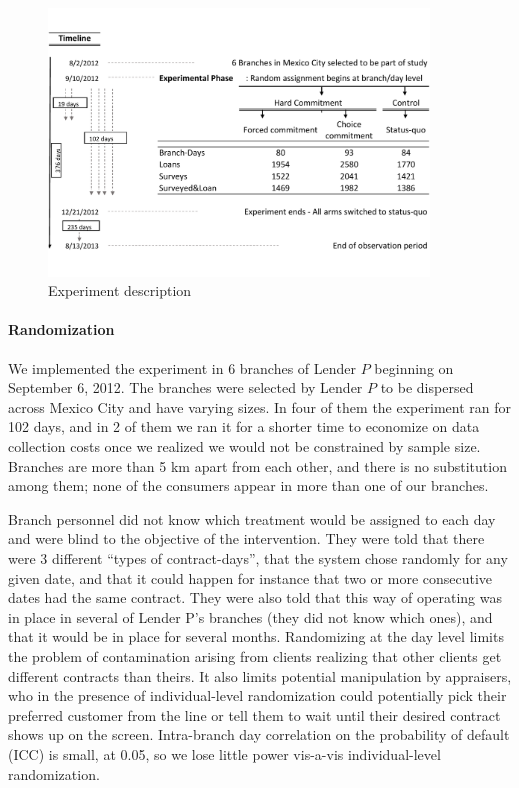 \documentclass[12pt, a4paper]{article}
\begin{document}
\begin{figure}[htbp]    
 \caption{Experiment description}
\begin{center}
\includegraphics[width=0.9\textwidth]{Figuras/consort.pdf}
  \end{center}
     \label{exp_description}
\end{figure}


\paragraph*{Randomization} We implemented the experiment in 6 branches of Lender $P$ beginning on September 6, 2012. The branches were selected by Lender $P$ to be dispersed across Mexico City and have varying sizes. In four of them the experiment ran for 102 days, and in 2 of them we ran it for a shorter time to economize on data collection costs once we realized we would not be constrained by sample size. %
Branches are more than 5 km apart from each other, and there is no substitution among them; none of the consumers appear in more than one of our branches.

Branch personnel did not know which treatment would be assigned to each day and were blind to the objective of the intervention. They were told that there were 3 different ``types of contract-days'', that the system chose randomly for any given date, and that it could happen for instance that two or more consecutive dates had the same contract. They were also told that this way of operating was in place in several of Lender P's branches (they did not know which ones), and that it would be in place for several months. Randomizing at the day level limits the problem of contamination arising from clients realizing that other clients get different contracts than theirs. It also limits potential manipulation by appraisers, who in the presence of individual-level randomization could potentially pick their preferred customer from the line or tell them to wait until their desired contract shows up on the screen. Intra-branch day correlation on the probability of default (ICC) is small, at {0.05}, so we lose little power vis-a-vis individual-level randomization.
\end{document}
